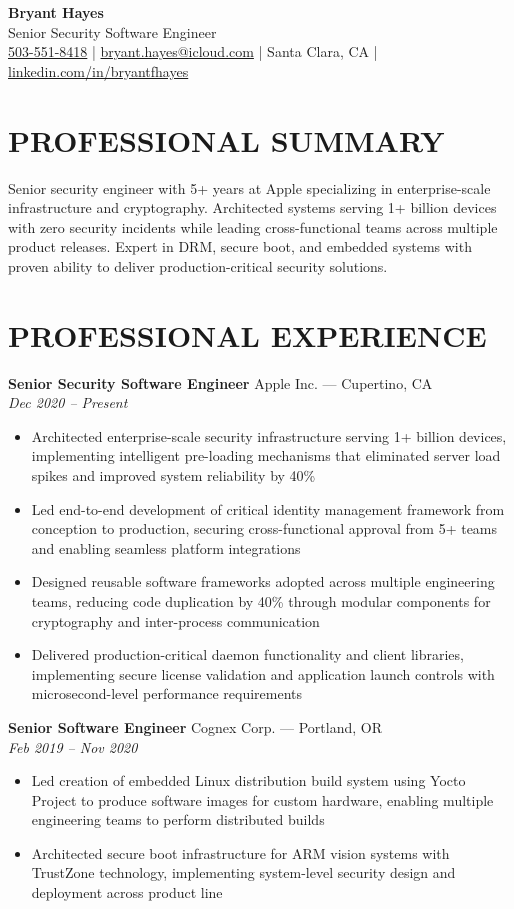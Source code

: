 \documentclass[10pt,letterpaper]{article}
\newcommand{\resumeheader}[6]{
  \begin{center}
    {\Huge\bfseries\color{headercolor} #1}\\[0.2em]
    {\Large\color{accentcolor} #2}\\[0.3em]
    \small
    \faPhone*{} \href{tel:#3}{#3} \quad|\quad
    \faEnvelope{} \href{mailto:#4}{#4} \quad|\quad
    \faMapMarker*{} #5 \quad|\quad
    \faLinkedin{} \href{https://linkedin.com/in/#6}{linkedin.com/in/#6}
  \end{center}
  \vspace{0.5em}
}
\newcommand{\experienceitem}[4]{
  \textbf{#1} \hfill \textcolor{accentcolor}{#2}\\
  \textit{#3} \hfill \textit{#4}\\[-0.8em]
}
\begin{document}
\resumeheader
  {Bryant Hayes}
  {Senior Security Software Engineer}
  {503-551-8418}
  {bryant.hayes@icloud.com}
  {Santa Clara, CA}
  {bryantfhayes}

\section{PROFESSIONAL SUMMARY}
Senior security engineer with 5+ years at Apple specializing in enterprise-scale infrastructure and cryptography. Architected systems serving 1+ billion devices with zero security incidents while leading cross-functional teams across multiple product releases. Expert in DRM, secure boot, and embedded systems with proven ability to deliver production-critical security solutions.

\section{PROFESSIONAL EXPERIENCE}

\experienceitem
  {Senior Security Software Engineer}
  {Apple Inc. — Cupertino, CA}
  {}
  {Dec 2020 – Present}
\begin{itemize}
  \item Architected enterprise-scale security infrastructure serving 1+ billion devices, implementing intelligent pre-loading mechanisms that eliminated server load spikes and improved system reliability by 40\%
  \item Led end-to-end development of critical identity management framework from conception to production, securing cross-functional approval from 5+ teams and enabling seamless platform integrations
  \item Designed reusable software frameworks adopted across multiple engineering teams, reducing code duplication by 40\% through modular components for cryptography and inter-process communication
  \item Delivered production-critical daemon functionality and client libraries, implementing secure license validation and application launch controls with microsecond-level performance requirements
\end{itemize}

\vspace{4pt}
\experienceitem
  {Senior Software Engineer}
  {Cognex Corp. — Portland, OR}
  {}
  {Feb 2019 – Nov 2020}
\begin{itemize}
  \item Led creation of embedded Linux distribution build system using Yocto Project to produce software images for custom hardware, enabling multiple engineering teams to perform distributed builds
  \item Architected secure boot infrastructure for ARM vision systems with TrustZone technology, implementing system-level security design and deployment across product line
\end{itemize}
\end{document}
